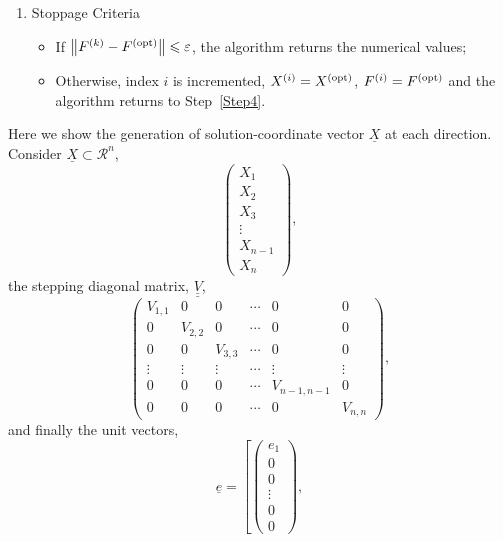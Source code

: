 \begin{enumerate}[{\bf Step 1: }]
   \item\label{Step10} Stoppage Criteria
       \begin{itemize}
           \item If $\left\|\mfr[F]{}{k}-\mfr[F]{}{\text{opt}}\right\|\le\epsilon$, the algorithm returns the numerical values;
           \item Otherwise, index $i$ is incremented, $\mfr[X]{}{i}=\mfr[X]{}{\text{opt}}$, $\mfr[F]{}{i}=\mfr[F]{}{\text{opt}}$ and the algorithm returns to Step~\ref{Step4}.
       \end{itemize}

\end{enumerate}


\begin{table}[h]
     Here we show the generation of solution-coordinate vector $\underline{X}$ at each direction. Consider $\underline{X}\subset\mathcal{R}^{n}$,
   \begin{displaymath}
        \begin{pmatrix}X_{1} \\ X_{2} \\ X_{3} \\ \vdots \\ X_{n-1} \\ X_{n} \end{pmatrix},
   \end{displaymath}
the stepping diagonal matrix, $\underline{\underline{V}}$,
   \begin{displaymath}
       \begin{pmatrix}
        V_{1,1} & 0      & 0      & \cdots & 0         & 0      \\
        0      & V_{2,2} & 0      & \cdots & 0         & 0      \\
        0      & 0      & V_{3,3} & \cdots & 0         & 0      \\
       \vdots  & \vdots & \vdots & \cdots & \vdots    & \vdots \\
        0      & 0      & 0      & \cdots & V_{n-1,n-1} & 0       \\
        0      & 0      & 0      & \cdots & 0         & V_{n,n} 
       \end{pmatrix},
   \end{displaymath}
and finally the unit vectors,
   \begin{displaymath}
      \underline{e} = \left[
             \begin{pmatrix}e_{1} \\ 0    \\ 0    \\ \vdots \\ 0     \\ 0    \end{pmatrix},

\end{displaymath}
\end{table}
